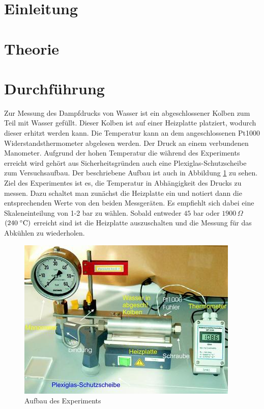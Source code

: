 \documentclass[12pt, a4paper, twoside]{scrartcl}
\begin{document}

\cleardoublepage
\tableofcontents
\cleardoublepage
\setcounter{page}{1}

\section{Einleitung}


\section{Theorie}
\label{sec:theorie}


\section{Durchführung}
\label{sec:durchfuehrung}

Zur Messung des Dampfdrucks von Wasser ist ein abgeschlossener Kolben zum Teil mit Wasser gefüllt. Dieser Kolben ist auf einer Heizplatte platziert, wodurch dieser erhitzt werden kann. Die Temperatur kann an dem angeschlossenen Pt1000 Widerstandsthermometer abgelesen werden. Der Druck an einem verbundenen Manometer. Aufgrund der hohen Temperatur die während des Experiments erreicht wird gehört aus Sicherheitsgründen auch eine Plexiglas-Schutzscheibe zum Versuchsaufbau. Der beschriebene Aufbau ist auch in Abbildung \ref{img:aufbau} zu sehen.\\


Ziel des Experimentes ist es, die Temperatur in Abhängigkeit des Drucks zu messen. Dazu schaltet man zunächst die Heizplatte ein und notiert dann die entsprechenden Werte von den beiden Messgeräten. Es empfiehlt sich dabei eine Skaleneinteilung von 1-2 bar zu wählen. Sobald entweder $45$ bar oder $1900\,\Omega$ $(240\mathrel{^{\circ}}\mathrel{\textnormal{C}})$ erreicht sind ist die Heizplatte auszuschalten und die Messung für das Abkühlen zu wiederholen.

\begin{figure} [h]
\centering
\includegraphics[scale=0.8]{aufbau.jpg}
\caption{\label{img:aufbau}Aufbau des Experiments\protect\footnotemark}
\end{figure}
\end{document}
